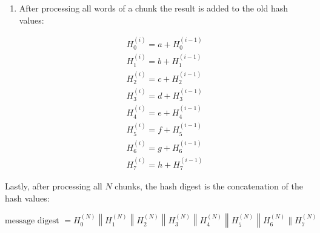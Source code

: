 \begin{enumerate}
	\item After processing all words of a chunk the result is added to the old hash values:
		
		\begin{equation}
		\label{eq:computationAddition}	
			\begin{array}{l}
				H_{0}^{(i)}=a+H_{0}^{(i-1)} \\
				H_{1}^{(i)}=b+H_{1}^{(i-1)} \\
				H_{2}^{(i)}=c+H_{2}^{(i-1)} \\
				H_{3}^{(i)}=d+H_{3}^{(i-1)} \\
				H_{4}^{(i)}=e+H_{4}^{(i-1)} \\
				H_{5}^{(i)}=f+H_{5}^{(i-1)} \\
				H_{6}^{(i)}=g+H_{6}^{(i-1)} \\
				H_{7}^{(i)}=h+H_{7}^{(i-1)}
			\end{array}
		\end{equation}
		
\end{enumerate}

Lastly, after processing all $N$ chunks, the hash digest is the concatenation of the hash values:

\begin{equation}
	\text{message digest } = H_{0}^{(N)}\left\|H_{1}^{(N)}\right\| H_{2}^{(N)}\left\|H_{3}^{(N)}\right\| H_{4}^{(N)}\left\|H_{5}^{(N)}\right\| H_{6}^{(N)} \| H_{7}^{(N)}
\end{equation}

